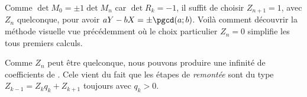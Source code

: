  
 \medskip
 
 
Comme $\det M_0 = \pm 1 \det M_n$ car $\det R_k = -1$, il suffit de choisir $Z_{n+1} = 1$, avec $Z_n$ quelconque, pour avoir $aY - bX = \pm \pgcd(a ; b)$. Voilà comment découvrir la méthode visuelle vue précédemment où le choix particulier $Z_n = 0$ simplifie les tous premiers calculs.


\begin{remark}
	Comme $Z_n$ peut être quelconque, nous pouvons produire une infinité de coefficients de \bb. Cele vient du fait que les étapes de \emph{\og remontée \fg} sont du type $Z_{k-1} = Z_k q_k + Z_{k+1}$ toujours avec $q_k > 0$.
\end{remark}
